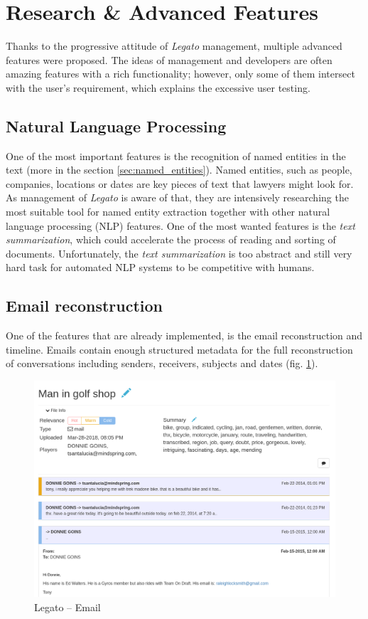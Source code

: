 \documentclass[
  digital, %
  table,   %
  lof,     %
  lot,     %
]{fithesis3}
\begin{document}
\section{Research \& Advanced Features}
\label{sec:legato_advanced}
Thanks to the progressive attitude of \textit{Legato} management, multiple advanced features were proposed.
The ideas of management and developers are often amazing features with a rich functionality; however, only some of them intersect with the user's requirement, which explains the excessive user testing.

\subsection*{Natural Language Processing}
One of the most important features is the recognition of named entities in the text (more in the section \ref{sec:named_entities}).
Named entities, such as people, companies, locations or dates are key pieces of text that lawyers might look for.
As management of \textit{Legato} is aware of that, they are intensively researching the most suitable tool for named entity extraction together with other natural language processing (NLP) features.
One of the most wanted features is the \textit{text summarization}, which could accelerate the process of reading and sorting of documents.
Unfortunately, the \textit{text summarization} is too abstract and still very hard task for automated NLP systems to be competitive with humans.

\subsection*{Email reconstruction}
One of the features that are already implemented, is the email reconstruction and timeline.
Emails contain enough structured metadata for the full reconstruction of conversations including senders, receivers, subjects and dates (fig. \ref{fig:legato_email}).

\begin{figure}[h]
\caption{Legato -- Email}
\label{fig:legato_email}
\includegraphics[width=\textwidth]{img/Legato-Email}
\end{figure}
\end{document}
